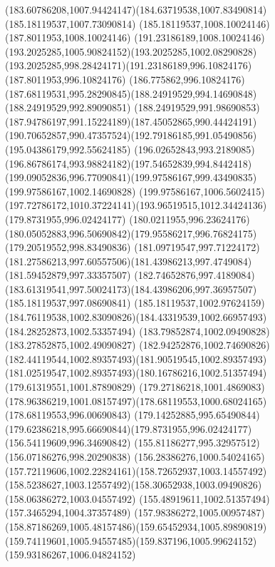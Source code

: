 {    \curveto(183.60786208,1007.94424147)(184.63719538,1007.83490814)(185.18119537,1007.73090814)
    \lineto(185.18119537,1008.10024146)
    \lineto(187.8011953,1008.10024146)
    \curveto(191.23186189,1008.10024146)(193.2025285,1005.90824152)(193.2025285,1002.08290828)
    \curveto(193.2025285,998.28424171)(191.23186189,996.10824176)(187.8011953,996.10824176)
    \lineto(186.775862,996.10824176)
    \curveto(187.68119531,995.28290845)(188.24919529,994.14690848)(188.24919529,992.89090851)
    \curveto(188.24919529,991.98690853)(187.94786197,991.15224189)(187.45052865,990.44424191)
    \curveto(190.70652857,990.47357524)(192.79186185,991.05490856)(195.04386179,992.55624185)
    \curveto(196.02652843,993.2189085)(196.86786174,993.98824182)(197.54652839,994.8442418)
    \curveto(199.09052836,996.77090841)(199.97586167,999.43490835)(199.97586167,1002.14690828)
    \curveto(199.97586167,1006.5602415)(197.72786172,1010.37224141)(193.96519515,1012.34424136)
    \moveto(179.8731955,996.02424177)
    \curveto(180.0211955,996.23624176)(180.05052883,996.50690842)(179.95586217,996.76824175)
    \lineto(179.20519552,998.83490836)
    \lineto(181.09719547,997.71224172)
    \curveto(181.27586213,997.60557506)(181.43986213,997.4749084)(181.59452879,997.33357507)
    \lineto(182.74652876,997.4189084)
    \curveto(183.61319541,997.50024173)(184.43986206,997.36957507)(185.18119537,997.08690841)
    \lineto(185.18119537,1002.97624159)
    \curveto(184.76119538,1002.83090826)(184.43319539,1002.66957493)(184.28252873,1002.53357494)
    \lineto(183.79852874,1002.09490828)
    \lineto(183.27852875,1002.49090827)
    \curveto(182.94252876,1002.74690826)(182.44119544,1002.89357493)(181.90519545,1002.89357493)
    \curveto(181.02519547,1002.89357493)(180.16786216,1002.51357494)(179.61319551,1001.87890829)
    \curveto(179.27186218,1001.4869083)(178.96386219,1001.08157497)(178.68119553,1000.68024165)
    \lineto(178.68119553,996.00690843)
    \curveto(179.14252885,995.65490844)(179.62386218,995.66690844)(179.8731955,996.02424177)
    \moveto(156.54119609,996.34690842)
    \lineto(155.81186277,995.32957512)
    \lineto(156.07186276,998.20290838)
    \curveto(156.28386276,1000.54024165)(157.72119606,1002.22824161)(158.72652937,1003.14557492)
    \curveto(158.5238627,1003.12557492)(158.30652938,1003.09490826)(158.06386272,1003.04557492)
    \lineto(155.48919611,1002.51357494)
    \lineto(157.3465294,1004.37357489)
    \curveto(157.98386272,1005.00957487)(158.87186269,1005.48157486)(159.65452934,1005.89890819)
    \curveto(159.74119601,1005.94557485)(159.837196,1005.99624152)(159.93186267,1006.04824152)
}
